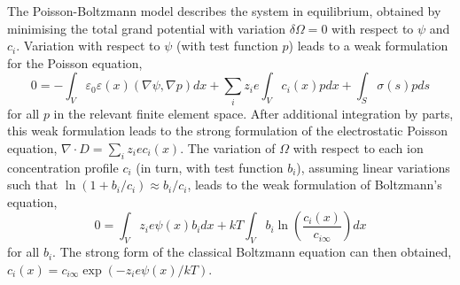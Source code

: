 The Poisson-Boltzmann model describes the system in equilibrium,
obtained by minimising the total grand potential with variation
$\delta\Omega=0$ with respect to $\psi$ and $c_i$. Variation with
respect to $\psi$ (with test function $p$) leads to a weak formulation
for the Poisson equation,
\begin{equation}
    0 = -\int_{V} \varepsilon_{0}\varepsilon(x) (\nabla\psi,\nabla p) dx + \sum_{i}z_i e \int_{V} c_{i}(x) p dx + \int_{S} \sigma(s) p ds  
    \label{weak_Poisson}
\end{equation}
for all $p$ in the relevant finite element space.  After additional
integration by parts, this weak formulation leads to the strong
formulation of the electrostatic Poisson equation,
$\nabla\cdot D = \sum_i z_i e c_{i}(x)$. The variation of $\Omega$ with
respect to each ion concentration profile $c_i$ (in turn, with test
function $b_i$), assuming linear variations such that
$\ln(1+b_i/c_i)\approx b_i/c_i$, leads to the weak formulation of Boltzmann's
equation,
\begin{equation}
    0 = \int_{V}z_i e \psi(x) b_i dx
    + kT \int_{V} b_i \ln\left(\frac{c_i(x)}{c_{i\infty}}\right)dx
    \label{weak_Boltzmann}
\end{equation}
for all $b_i$. The strong form of the classical Boltzmann equation can then obtained, $c_i(x)=c_{i\infty}\exp(-z_i e \psi(x)/kT)$. 


